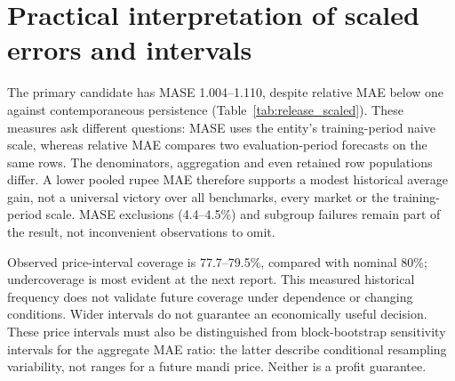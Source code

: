 \section{Practical interpretation of scaled errors and intervals}\label{sec:intervals}
The primary candidate has MASE 1.004--1.110, despite relative MAE below one against contemporaneous persistence (Table~\ref{tab:release_scaled}). These measures ask different questions: MASE uses the entity's training-period naive scale, whereas relative MAE compares two evaluation-period forecasts on the same rows. The denominators, aggregation and even retained row populations differ. A lower pooled rupee MAE therefore supports a modest historical average gain, not a universal victory over all benchmarks, every market or the training-period scale. MASE exclusions (4.4--4.5\%) and subgroup failures remain part of the result, not inconvenient observations to omit.

\begin{table}[t]\centering\small\setlength{\tabcolsep}{4pt}
\caption{Primary study scaled errors and observed nominal 80\% price-interval performance. C/P denote candidate/persistence. Width is divided by origin price. MASE excludes unusable training scales.}\label{tab:release_scaled}

\end{table}

Observed price-interval coverage is 77.7--79.5\%, compared with nominal 80\%; undercoverage is most evident at the next report. This measured historical frequency does not validate future coverage under dependence or changing conditions. Wider intervals do not guarantee an economically useful decision. These price intervals must also be distinguished from block-bootstrap sensitivity intervals for the aggregate MAE ratio: the latter describe conditional resampling variability, not ranges for a future mandi price. Neither is a profit guarantee.

